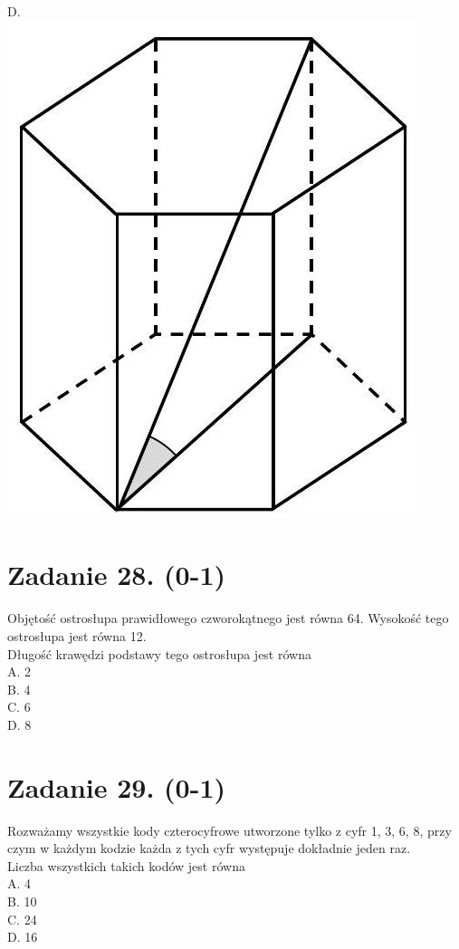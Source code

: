 \documentclass[10pt]{article}
\begin{document}
D.\\
\includegraphics[max width=\textwidth, center]{2024_11_21_0a35d272448d5080a489g-20(3)}

\section*{Zadanie 28. (0-1)}
Objętość ostrosłupa prawidłowego czworokątnego jest równa 64. Wysokość tego ostrosłupa jest równa 12.\\
Długość krawędzi podstawy tego ostrosłupa jest równa\\
A. 2\\
B. 4\\
C. 6\\
D. 8

\section*{Zadanie 29. (0-1)}
Rozważamy wszystkie kody czterocyfrowe utworzone tylko z cyfr 1, 3, 6, 8, przy czym w każdym kodzie każda z tych cyfr występuje dokładnie jeden raz.\\
Liczba wszystkich takich kodów jest równa\\
A. 4\\
B. 10\\
C. 24\\
D. 16
\end{document}
